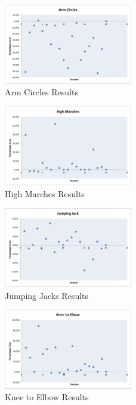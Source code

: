 \begin{figure} [htp]
	\includegraphics[width=0.5\textwidth]{images/armcircles}
\caption{Arm Circles Results}
\end{figure}
\begin{figure}[htp]
	\includegraphics[width=0.5\textwidth]{images/highmarches}
\caption{High Marches Results}
\end{figure}
\begin{figure} [htp]
	\includegraphics[width=0.5\textwidth]{images/jumpingjack}
\caption{Jumping Jacks Results}
\end{figure}
\begin{figure} [htp]
	\includegraphics[width=0.5\textwidth]{images/kneetoelbow}
\caption{Knee to Elbow Results}
\end{figure}

